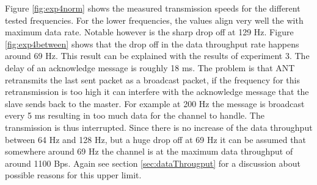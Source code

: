 \begin{description}
	Figure \ref{fig:exp4norm} shows the measured transmission speeds for the different tested frequencies. For the lower frequencies, the values align very well the with maximum data rate. Notable however is the sharp drop off at 129 Hz. Figure \ref{fig:exp4between} shows
	that the drop off in the data throughput rate happens around 69 Hz. This result can be explained with the results of experiment 3. The delay of an acknowledge message is roughly 18 ms. The problem is that ANT retransmits the last sent packet as a broadcast packet, if the frequency for this retransmission is too high it can interfere with the acknowledge message that the slave sends back to the master. For example at 200 Hz the message is broadcast every 5 ms resulting in too much data for the channel to handle. The transmission is thus interrupted. Since there is no increase of the data throughput between 64 Hz and 128 Hz, but a huge drop off at 69 Hz it can be assumed that somewhere around 69 Hz the channel is at the maximum data throughput of around 1100 Bps. Again see section \ref{sec:dataThrougput} for a discussion about possible reasons for this upper limit. 

\end{description}
\newpage


